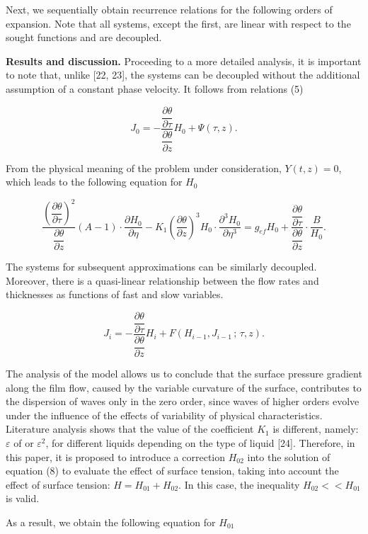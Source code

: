 \begin{multicols}{2}
Next, we sequentially obtain recurrence relations for the following
orders of expansion. Note that all systems, except the first, are linear
with respect to the sought functions and are decoupled.

{\bfseries Results and discussion.} Proceeding to a more detailed analysis,
it is important to note that, unlike {[}22, 23{]}, the systems can be
decoupled without the additional assumption of a constant phase
velocity. It follows from relations (5)

\begin{equation}
J_0 = - \frac{\dfrac{\partial \theta}{\partial \tau}}{\dfrac{\partial \theta}{\partial z}} H_0 + \Psi(\tau, z).
\end{equation}

From the physical meaning of the problem under consideration,
$Y(t,z)=0$, which leads to the following equation for $H_0$
\end{multicols}

\begin{equation}
\frac{\left( \dfrac{\partial \theta}{\partial \tau} \right)^2}{\dfrac{\partial \theta}{\partial z}} (A - 1) \cdot \frac{\partial H_0}{\partial \eta}
- K_1 \left( \frac{\partial \theta}{\partial z} \right)^3 H_0 \cdot \frac{\partial^3 H_0}{\partial \eta^3}
= g_{\mathit{ef}} H_0 + \frac{\dfrac{\partial \theta}{\partial \tau}}{\dfrac{\partial \theta}{\partial z}} \cdot \frac{B}{H_0}.
\end{equation}

\begin{multicols}{2}
The systems for subsequent approximations can be similarly decoupled.
Moreover, there is a quasi-linear relationship between the flow rates
and thicknesses as functions of fast and slow variables.

\begin{equation}
J_i = - \frac{\dfrac{\partial \theta}{\partial \tau}}{\dfrac{\partial \theta}{\partial z}} H_i + F\left(H_{i-1}, J_{i-1} \, ; \, \tau, z \right).
\end{equation}

The analysis of the model allows us to conclude that the surface
pressure gradient along the film flow, caused by the variable
curvature of the surface, contributes to the dispersion of waves only
in the zero order, since waves of higher orders evolve under the
influence of the effects of variability of physical
characteristics. Literature analysis shows that the value of the
coefficient $K_1$ is different, namely: $\varepsilon$ of or
$\varepsilon^2$, for different liquids depending on the type of liquid
{[}24{]}.  Therefore, in this paper, it is proposed to introduce a
correction $H_{02}$ into the solution of equation (8) to evaluate the
effect of surface tension, taking into account the effect of surface
tension: $H=H_{01}+H_{02}$.  In this case, the inequality
$H_{02}<<H_{01}$ is valid.

As a result, we obtain the following equation for $H_{01}$
\end{multicols}

